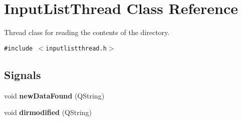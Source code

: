 \hypertarget{class_input_list_thread}{
\section{InputListThread Class Reference}
\label{class_input_list_thread}
}
Thread class for reading the contents of the directory.  


{\tt \#include $<$inputlistthread.h$>$}

\subsection*{Signals}
\begin{CompactItemize}
\item 
\hypertarget{class_input_list_thread_e50baa8521f48cceed2228439eb8ec86}{
void \textbf{newDataFound} (QString)}
\label{class_input_list_thread_e50baa8521f48cceed2228439eb8ec86}

\item 
\hypertarget{class_input_list_thread_23e7921cb0cab1b6ead9d932d3168b9f}{
void \textbf{dirmodified} (QString)}
\label{class_input_list_thread_23e7921cb0cab1b6ead9d932d3168b9f}

\end{CompactItemize}

